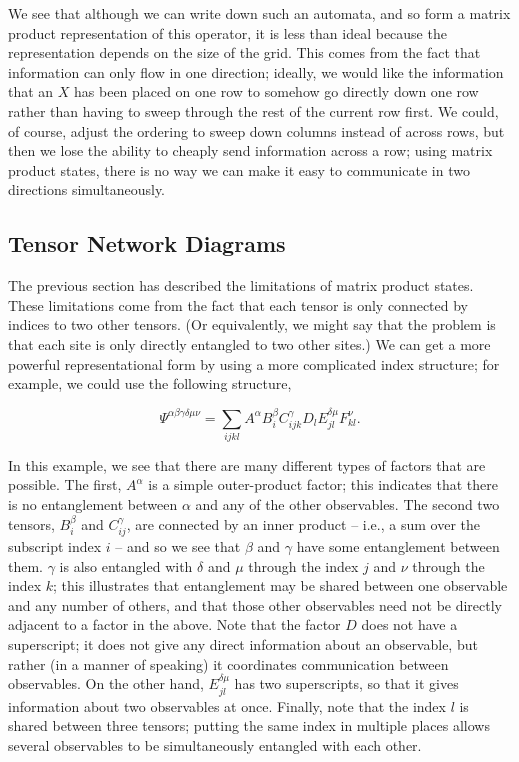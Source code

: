 \documentclass{amsbook}
\theoremstyle{plain}
\theoremstyle{definition}
\theoremstyle{remark}
\newcommand{\eqn}[2][]{\begin{equation}\label{#1}#2\end{equation}}
\begin{document}
We see that although we can write down such an automata, and so form a matrix product representation of this operator, it is less than ideal because the representation depends on the size of the grid.  This comes from the fact that information can only flow in one direction;  ideally, we would like the information that an $X$ has been placed on one row to somehow go directly down one row rather than having to sweep through the rest of the current row first.  We could, of course, adjust the ordering to sweep down columns instead of across rows, but then we lose the ability to cheaply send information across a row;  using matrix product states, there is no way we can make it easy to communicate in two directions simultaneously.
\subsection{Tensor Network Diagrams}

\label{tensordiagram}

The previous section has described the limitations of matrix product states.  These limitations come from the fact that each tensor is only connected by indices to two other tensors.  (Or equivalently, we might say that the problem is that each site is only directly entangled to two other sites.)  We can get a more powerful representational form by using a more complicated index structure; for example, we could use the following structure,

\eqn[crazy-tensor-product]{\Psi^{\alpha\beta\gamma\delta\mu\nu} =
  \sum_{ijkl} A^\alpha B^{\beta}_{i} C^{\gamma}_{ijk} D_{l} E_{jl}^{\delta\mu} F_{kl}^{\nu}.}

In this example, we see that there are many different types of factors that are possible.  The first, $A^\alpha$ is a simple outer-product factor;  this indicates that there is no entanglement between $\alpha$ and any of the other observables.  The second two tensors, $B^\beta_i$ and $C^\gamma_{ij}$, are connected by an inner product -- i.e., a sum over the subscript index $i$ -- and so we see that $\beta$ and $\gamma$ have some entanglement between them.  $\gamma$ is also entangled with $\delta$ and $\mu$ through the index $j$ and $\nu$ through the index $k$;  this illustrates that entanglement may be shared between one observable and any number of others, and that those other observables need not be directly adjacent to a factor in the above.  Note that the factor $D$ does not have a superscript;  it does not give any direct information about an observable, but rather (in a manner of speaking) it coordinates communication between observables.  On the other hand, $E_{jl}^{\delta\mu}$ has two superscripts, so that it gives information about two observables at once.  Finally, note that the index $l$ is shared between three tensors;  putting the same index in multiple places allows several observables to be simultaneously entangled with each other.
\end{document}
